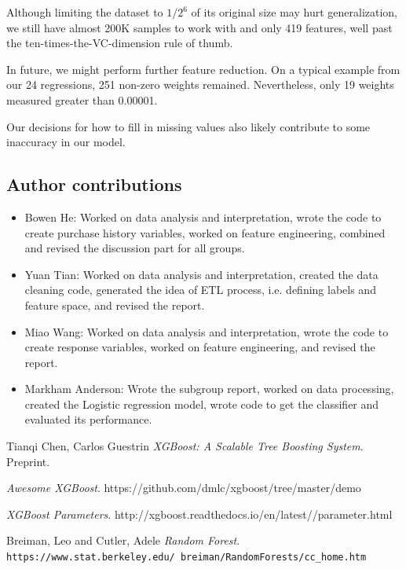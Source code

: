 \documentclass{article}
\begin{document}
\begin{spacing}{1}
\begin{large}
Although limiting the dataset to $1/2^6$ of its original size may hurt generalization, we still have almost 200K samples to work with and only 419 features, well past the ten-times-the-VC-dimension rule of thumb.\cite{Amlbook}

In future, we might perform further feature reduction. On a typical example from our 24 regressions, 251 non-zero weights remained. Nevertheless, only 19 weights measured greater than 0.00001.

Our decisions for how to fill in missing values also likely contribute to some inaccuracy in our model.

\subsection{Author contributions}
\begin{itemize}
	\item Bowen He:  Worked on data analysis and interpretation, wrote the code to create purchase history variables, worked on feature engineering, combined and revised the discussion part for all groups.

	\item Yuan Tian:  Worked on data analysis and interpretation, created the data cleaning code, generated the idea of ETL process, i.e. defining labels and feature space, and revised the report.

	\item Miao Wang:  Worked on data analysis and interpretation, wrote the code to create response variables, worked on feature engineering, and revised the report.

	\item Markham Anderson: Wrote the subgroup report, worked on data processing, created the Logistic regression model, wrote code to get the classifier and evaluated its performance.
\end{itemize}

\begin{thebibliography}{9}

	Tianqi Chen, Carlos Guestrin
	\emph{XGBoost: A Scalable Tree Boosting System}. Preprint.

	\emph{Awesome XGBoost}.
	https://github.com/dmlc/xgboost/tree/master/demo

	\emph{XGBoost Parameters}.
	http://xgboost.readthedocs.io/en/latest//parameter.html

	Breiman, Leo and Cutler, Adele
	\textit{Random Forest}.
	\\\texttt{https://www.stat.berkeley.edu/~breiman/RandomForests/cc\_home.htm}


\end{thebibliography}
\end{large}
\end{spacing}
\end{document}
